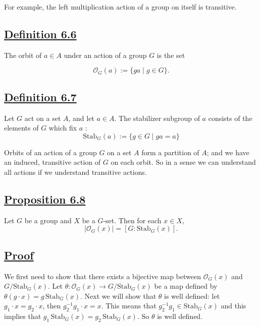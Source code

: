 For example, the left multiplication action of a group on itself is transitive.

\vspace{1em}

\subsection*{\underline{Definition 6.6}}
The orbit of $a \in A$ under an action of a group $G$ is the set

\vspace{3em}

\[
\mathcal{O}_G(a) := \{ga \mid g \in G\}.
\]

\vspace{1em}

\subsection*{\underline{Definition 6.7}}
Let $G$ act on a set $A$, and let $a \in A$. The stabilizer subgroup of \underline{$a$} consists of the elements of $G$ which fix \underline{$a$} :
\[
\text{Stab}_G(a) := \{g \in G \mid ga = a\}
\]



Orbits of an action of a group $G$ on a set $A$ form a partition of $A$; and we have an induced, transitive action of $G$ on each orbit. So in a sense we can understand all actions if we understand transitive actions.


\vspace{1em}

\subsection*{\underline{\color{blue}Proposition 6.8}}
{\color{blue}
Let $G$ be a group and $X$ be a $G$-set. Then for each $x \in X$,
\[
|\mathcal{O}_G(x)| = [G : \text{Stab}_G(x)].
\]
}

\vspace{3em}

\subsection*{\underline{Proof}}
We first need to show that there exists a bijective map between $\mathcal{O}_G(x)$ and $G/\text{Stab}_G(x)$. Let $\theta : \mathcal{O}_G(x) \longrightarrow G/\text{Stab}_G(x)$ be a map defined by $\theta(g \cdot x) = g \, \text{Stab}_G(x)$. Next we will show that $\theta$ is well defined: let $g_1 \cdot x = g_2 \cdot x$, then $g_2^{-1} g_1 \cdot x = x$. This means that $g_2^{-1} g_1 \in \text{Stab}_G(x)$ and this implies that $g_1 \, \text{Stab}_G(x) = g_2 \, \text{Stab}_G(x)$. So $\theta$ is well defined.

